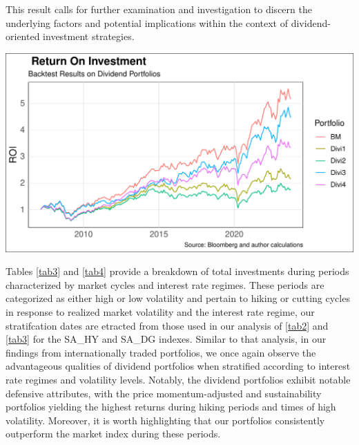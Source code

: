 \documentclass[10pt,preprint, authoryear]{elsarticle}
\let\origfigure\figure
\let\endorigfigure\endfigure
\renewenvironment{figure}[1][2] {
    \expandafter\origfigure\expandafter[H]
} {
    \endorigfigure
}
\numberwithin{equation}{section}
\numberwithin{figure}{section}
\numberwithin{table}{section}
\begin{document}
This result calls for further examination and investigation to discern
the underlying factors and potential implications within the context of
dividend-oriented investment strategies.

\begin{figure}[H]

\includegraphics{Much_Ado_About_Dividends_files/figure-latex/Figure3-1} \hfill{}

\caption{Rolling 3 Year Returns \label{fig3}}\label{fig:Figure3}
\end{figure}

Tables \ref{tab3} and \ref{tab4} provide a breakdown of total
investments during periods characterized by market cycles and interest
rate regimes. These periods are categorized as either high or low
volatility and pertain to hiking or cutting cycles in response to
realized market volatility and the interest rate regime, our
stratifcation dates are etracted from those used in our analysis of
\ref{tab2} and \ref{tab3} for the SA\_HY and SA\_DG indexes. Similar to
that analysis, in our findings from internationally traded portfolios,
we once again observe the advantageous qualities of dividend portfolios
when stratified according to interest rate regimes and volatility
levels. Notably, the dividend portfolios exhibit notable defensive
attributes, with the price momentum-adjusted and sustainability
portfolios yielding the highest returns during hiking periods and times
of high volatility. Moreover, it is worth highlighting that our
portfolios consistently outperform the market index during these
periods.
\end{document}
